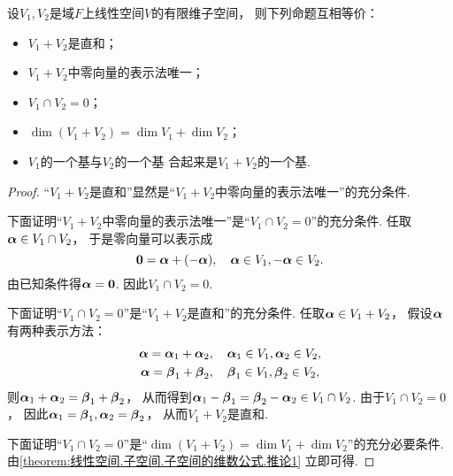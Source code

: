 \begin{theorem}
设\(V_1,V_2\)是域\(F\)上线性空间\(V\)的有限维子空间，
则下列命题互相等价：\begin{itemize}
	\item \(V_1+V_2\)是直和；
	\item \(V_1+V_2\)中零向量的表示法唯一；
	\item \(V_1 \cap V_2=0\)；
	\item \(\dim(V_1+V_2)=\dim V_1+\dim V_2\)；
	\item \(V_1\)的一个基与\(V_2\)的一个基 合起来是\(V_1+V_2\)的一个基.
\end{itemize}
\begin{proof}
“\(V_1+V_2\)是直和”显然是“\(V_1+V_2\)中零向量的表示法唯一”的充分条件.

下面证明“\(V_1+V_2\)中零向量的表示法唯一”是“\(V_1 \cap V_2=0\)”的充分条件.
任取\(\boldsymbol\alpha \in V_1 \cap V_2\)，
于是零向量可以表示成\[
	\boldsymbol0 = \boldsymbol\alpha + (-\boldsymbol\alpha),
	\quad
	\boldsymbol\alpha \in V_1,
	-\boldsymbol\alpha \in V_2.
\]
由已知条件得\(\boldsymbol\alpha = \boldsymbol0\).
因此\(V_1 \cap V_2 = 0\).

下面证明“\(V_1 \cap V_2=0\)”是“\(V_1+V_2\)是直和”的充分条件.
任取\(\boldsymbol\alpha \in V_1 + V_2\)，
假设\(\boldsymbol\alpha\)有两种表示方法：\begin{gather*}
	\boldsymbol\alpha = \boldsymbol\alpha_1 + \boldsymbol\alpha_2,
	\quad \boldsymbol\alpha_1 \in V_1,
	\boldsymbol\alpha_2 \in V_2, \\
	\boldsymbol\alpha = \boldsymbol\beta_1 + \boldsymbol\beta_2,
	\quad \boldsymbol\beta_1 \in V_1,
	\boldsymbol\beta_2 \in V_2,
\end{gather*}
则\(\boldsymbol\alpha_1 + \boldsymbol\alpha_2
= \boldsymbol\beta_1 + \boldsymbol\beta_2\)，
从而得到\(\boldsymbol\alpha_1 - \boldsymbol\beta_1
= \boldsymbol\beta_2 - \boldsymbol\alpha_2
\in V_1 \cap V_2\).
由于\(V_1 \cap V_2 = 0\)，
因此\(\boldsymbol\alpha_1 = \boldsymbol\beta_1,
\boldsymbol\alpha_2 = \boldsymbol\beta_2\)，
从而\(V_1 + V_2\)是直和.

下面证明“\(V_1 \cap V_2=0\)”是“\(\dim(V_1+V_2)=\dim V_1+\dim V_2\)”的充分必要条件.
由\cref{theorem:线性空间.子空间.子空间的维数公式.推论1} 立即可得.


\end{proof}
\end{theorem}
